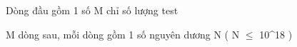 Dòng đầu gồm 1 số M chỉ số lượng test

M dòng sau, mỗi dòng gồm 1 số nguyên dương N ( N  $\le$  10^18 )